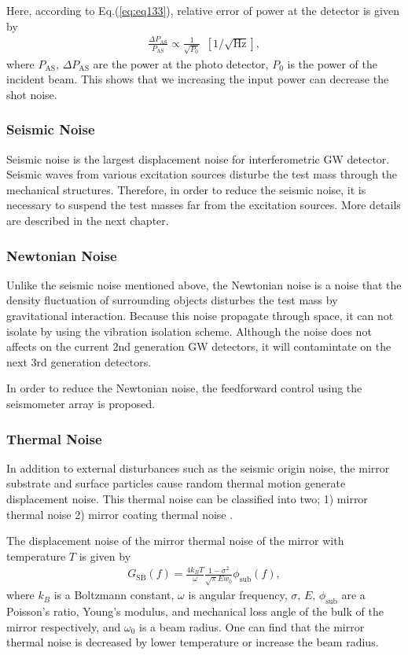 Here, according to Eq.(\ref{eq:eq133}), relative error of power at the detector is given by 
\begin{eqnarray}
  \frac{\Delta P_{\mathrm{AS}}}{P_{\mathrm{AS}}}  \propto \frac{1}{\sqrt{P_{\mathrm{0}}}}\ \ [1/\sqrt{\mathrm{Hz}}],  \label{eq:eq136}
\end{eqnarray}
where $P_{\mathrm{AS}},\,\Delta P_{\mathrm{AS}}$ are the power at the photo detector, $P_0$ is the power of the incident beam. This shows that we increasing the input power can decrease the shot noise.

\subsubsection{Seismic Noise}
Seismic noise is the largest displacement noise for interferometric GW detector. Seismic waves from various excitation sources disturbe the test mass through the mechanical structures. Therefore, in order to reduce the seismic noise, it is necessary to suspend the test masses far from the excitation sources. More details are described in the next chapter.

\subsubsection{Newtonian Noise}
Unlike the seismic noise mentioned above, the Newtonian noise is a noise that the density fluctuation of surrounding objects disturbes the test mass by gravitational interaction. Because this noise propagate through space, it can not isolate by using the vibration isolation scheme. Although the noise does not affects on the current 2nd generation GW detectors, it will contamintate on the next 3rd generation detectors.

In order to reduce the Newtonian noise, the feedforward control using the seismometer array is proposed.

\subsubsection{Thermal Noise}
In addition to external disturbances such as the seismic origin noise, the mirror substrate and surface particles cause random thermal motion generate displacement noise. This thermal noise can be classified into two; 1) mirror thermal noise 2) mirror coating thermal noise \cite{dan2016study}.

The displacement noise of the mirror thermal noise of the mirror with temperature $T$ is given by \cite{levin1998internal,numata2003wide}
\begin{eqnarray}
  G_{\mathrm{SB}}(f)=\frac{4 k_{B} T}{\omega} \frac{1-\sigma^{2}}{\sqrt{\pi} E w_{0}} \phi_{\mathrm{sub}}(f),
  \label{eq:eq140}
\end{eqnarray}
where $k_{B}$ is a Boltzmann constant, $\omega$ is angular frequency, $\sigma,\,E,\, \phi_{\mathrm{sub}}$ are a Poisson's ratio, Young's modulus, and mechanical loss angle of the bulk of the mirror respectively, and $\omega_0$ is a beam radius. One can find that the mirror thermal noise is decreased by lower temperature or increase the beam radius.

